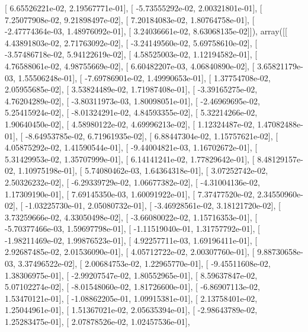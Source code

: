 \documentclass{article}
\begin{document}
       [  6.65526221e-02,   2.19567771e-01],
       [ -5.73555292e-02,   2.00321801e-01],
       [  7.25077908e-02,   9.21898497e-02],
       [  7.20184083e-02,   1.80764758e-01],
       [ -2.47774364e-03,   1.48976092e-01],
       [  3.24036661e-02,   8.63068135e-02]]), array([[  4.43891803e-02,   2.71763092e-02],
       [ -3.24149560e-02,   5.69758610e-02],
       [ -3.57486718e-02,   5.94122619e-02],
       [  4.58525003e-02,   1.12194582e-01],
       [  4.76588061e-02,   4.98755669e-02],
       [  6.60482207e-03,   4.06840890e-02],
       [  3.65821179e-03,   1.55506248e-01],
       [ -7.69786901e-02,   1.49990653e-01],
       [  1.37754708e-02,   2.05955685e-02],
       [  3.53824489e-02,   1.71987408e-01],
       [ -3.39165275e-02,   4.76204289e-02],
       [ -3.80311973e-03,   1.80098051e-01],
       [ -2.46969695e-02,   5.25415924e-02],
       [ -8.01324291e-02,   4.84593355e-02],
       [  5.32214266e-02,   1.90640450e-02],
       [  4.58980122e-02,   4.69996213e-02],
       [  1.12324487e-02,   1.47082488e-01],
       [ -8.64953785e-02,   6.71961935e-02],
       [  6.88447304e-02,   1.15757621e-02],
       [  4.05875292e-02,   1.41590544e-01],
       [ -9.44004821e-03,   1.16702672e-01],
       [  5.31429953e-02,   1.35707999e-01],
       [  6.14141241e-02,   1.77829642e-01],
       [  8.48129157e-02,   1.10975198e-01],
       [  5.74080462e-03,   1.64364318e-01],
       [  3.07252742e-02,   2.50326232e-02],
       [ -6.29339729e-02,   1.06677382e-02],
       [ -4.31004136e-02,   1.17309190e-01],
       [  7.69145350e-03,   1.60091922e-01],
       [  7.37477520e-02,   2.34550960e-02],
       [ -1.03225730e-01,   2.05080732e-01],
       [ -3.46928561e-02,   3.18121720e-02],
       [  3.73259666e-02,   4.33050498e-02],
       [ -3.66080022e-02,   1.15716353e-01],
       [ -5.70377466e-03,   1.59697798e-01],
       [ -1.11519040e-01,   1.31757792e-01],
       [ -1.98211469e-02,   1.99876523e-01],
       [  4.92257711e-03,   1.69196411e-01],
       [  2.92687485e-02,   2.01536090e-01],
       [  4.05712722e-02,   2.00307760e-01],
       [  9.88730658e-03,   3.37496522e-02],
       [  2.00684753e-02,   1.22965770e-01],
       [ -9.45511608e-02,   1.38306975e-01],
       [ -2.99207547e-02,   1.80552965e-01],
       [  8.59637847e-02,   5.07102274e-02],
       [ -8.01548060e-02,   1.81726600e-01],
       [ -6.86907113e-02,   1.53470121e-01],
       [ -1.08862205e-01,   1.09915381e-01],
       [  2.13758401e-02,   1.25044961e-01],
       [  1.51367021e-02,   2.05635394e-01],
       [ -2.98643789e-02,   1.25283475e-01],
       [  2.07878526e-02,   1.02457536e-01],
\end{document}
